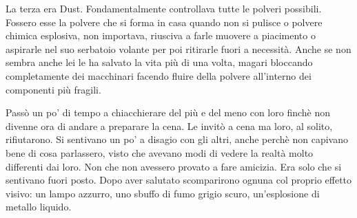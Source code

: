     La terza era Dust. Fondamentalmente controllava tutte le polveri
    possibili. Fossero esse la polvere che si forma in casa quando non si
    pulisce o polvere chimica esplosiva, non importava, riusciva a farle
    muovere a piacimento o aspirarle nel suo serbatoio volante per poi
    ritirarle fuori a necessità. Anche se non sembra anche lei le ha
    salvato la vita più di una volta, magari bloccando completamente dei
    macchinari facendo fluire della polvere all'interno dei componenti più
    fragili.

    Passò un po' di tempo a chiacchierare del più e del meno con loro
    finchè non divenne ora di andare a preparare la cena. Le invitò a cena
    ma loro, al solito, rifiutarono. Si sentivano un po' a disagio con gli
    altri, anche perchè non capivano bene di cosa parlassero, visto che
    avevano modi di vedere la realtà molto differenti dai loro. Non che non
    avessero provato a fare amicizia. Era solo che si sentivano fuori
    posto. Dopo aver salutato scomparirono ognuna col proprio effetto
    visivo: un lampo azzurro, uno sbuffo di fumo grigio scuro,
    un'esplosione di metallo liquido.

